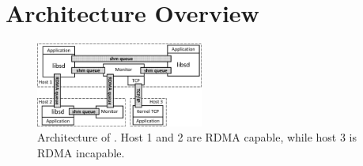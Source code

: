 \section{Architecture Overview}
\label{sec:architecture}


\begin{figure}[t!]
	\centering
	\includegraphics[width=0.49\textwidth]{images/architecture_new}
	\vspace{-15pt}
	\caption{Architecture of \sys{}. Host 1 and 2 are RDMA capable, while host 3 is RDMA incapable.}
	\label{fig:architecture}
\end{figure}

